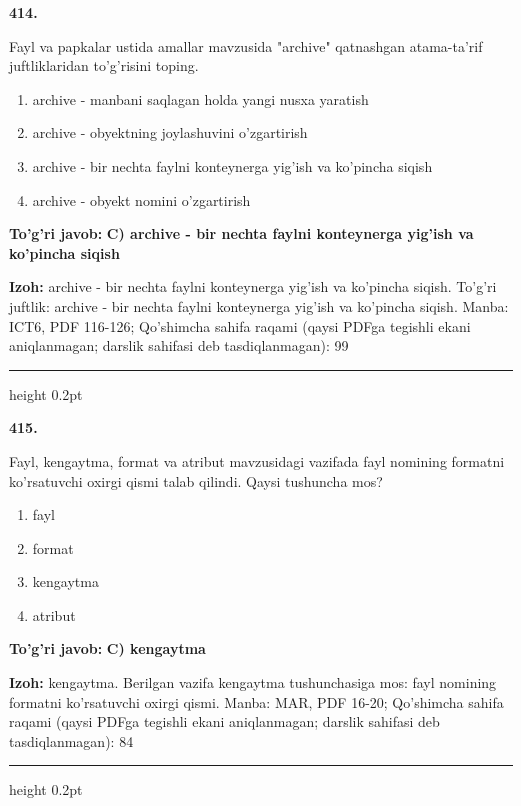 \documentclass[10pt,a4paper]{article}
\begin{document}
{\bfseries\sffamily\color{ink} 414.}
\par
Fayl va papkalar ustida amallar mavzusida "archive" qatnashgan atama-ta'rif juftliklaridan to'g'risini toping.
\begin{enumerate}[label=\Alph*),leftmargin=9mm]
\item archive - manbani saqlagan holda yangi nusxa yaratish
\item archive - obyektning joylashuvini o'zgartirish
\item archive - bir nechta faylni konteynerga yig'ish va ko'pincha siqish
\item archive - obyekt nomini o'zgartirish
\end{enumerate}
\begin{tcolorbox}[enhanced,breakable,colback=teal!4,colframe=teal!60!black,boxrule=0.45pt,arc=1.2mm,left=2.7mm,right=2.7mm,top=1.8mm,bottom=1.8mm,before skip=2mm,after skip=2mm]
{\bfseries\sffamily\color{teal}To'g'ri javob:} \textbf{C) archive - bir nechta faylni konteynerga yig'ish va ko'pincha siqish}
\par\smallskip
{\bfseries Izoh:} archive - bir nechta faylni konteynerga yig'ish va ko'pincha siqish. To'g'ri juftlik: archive - bir nechta faylni konteynerga yig'ish va ko'pincha siqish. Manba: ICT6, PDF 116-126; Qo'shimcha sahifa raqami (qaysi PDFga tegishli ekani aniqlanmagan; darslik sahifasi deb tasdiqlanmagan): 99
\end{tcolorbox}
\vspace{2mm}\hrule height 0.2pt\vspace{3mm}

{\bfseries\sffamily\color{ink} 415.}
\par
Fayl, kengaytma, format va atribut mavzusidagi vazifada fayl nomining formatni ko'rsatuvchi oxirgi qismi talab qilindi. Qaysi tushuncha mos?
\begin{enumerate}[label=\Alph*),leftmargin=9mm]
\item fayl
\item format
\item kengaytma
\item atribut
\end{enumerate}
\begin{tcolorbox}[enhanced,breakable,colback=teal!4,colframe=teal!60!black,boxrule=0.45pt,arc=1.2mm,left=2.7mm,right=2.7mm,top=1.8mm,bottom=1.8mm,before skip=2mm,after skip=2mm]
{\bfseries\sffamily\color{teal}To'g'ri javob:} \textbf{C) kengaytma}
\par\smallskip
{\bfseries Izoh:} kengaytma. Berilgan vazifa kengaytma tushunchasiga mos: fayl nomining formatni ko'rsatuvchi oxirgi qismi. Manba: MAR, PDF 16-20; Qo'shimcha sahifa raqami (qaysi PDFga tegishli ekani aniqlanmagan; darslik sahifasi deb tasdiqlanmagan): 84
\end{tcolorbox}
\vspace{2mm}\hrule height 0.2pt\vspace{3mm}
\end{document}
